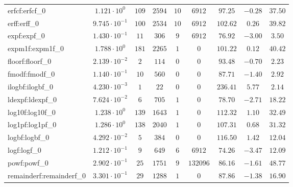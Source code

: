 \begin{tabular}{|l|c|c|c|c|c|c|c|c|}
erfcf:erfcf\_0               & $ 1.121 \cdot 10^{0}  $ & $ 109    $ & $ 2594  $ & $ 10  $ & $ 6912   $ & $ 97.25       $ & $ -0.28   $ & $ 37.50   $ \\
erff:erff\_0                 & $ 9.745 \cdot 10^{-1} $ & $ 100    $ & $ 2534  $ & $ 10  $ & $ 6912   $ & $ 102.62      $ & $ 0.26    $ & $ 39.82   $ \\
expf:expf\_0                 & $ 1.430 \cdot 10^{-1} $ & $ 11     $ & $ 306   $ & $ 9   $ & $ 6912   $ & $ 76.92       $ & $ -3.00   $ & $ 3.50    $ \\
expm1f:expm1f\_0             & $ 1.788 \cdot 10^{0}  $ & $ 181    $ & $ 2265  $ & $ 1   $ & $ 0      $ & $ 101.22      $ & $ 0.12    $ & $ 40.42   $ \\
floorf:floorf\_0             & $ 2.139 \cdot 10^{-2} $ & $ 2      $ & $ 114   $ & $ 0   $ & $ 0      $ & $ 93.48       $ & $ -0.70   $ & $ 2.23    $ \\
fmodf:fmodf\_0               & $ 1.140 \cdot 10^{-1} $ & $ 10     $ & $ 560   $ & $ 0   $ & $ 0      $ & $ 87.71       $ & $ -1.40   $ & $ 2.92    $ \\
ilogbf:ilogbf\_0             & $ 4.230 \cdot 10^{-3} $ & $ 1      $ & $ 22    $ & $ 0   $ & $ 0      $ & $ 236.41      $ & $ 5.77    $ & $ 2.14    $ \\
ldexpf:ldexpf\_0             & $ 7.624 \cdot 10^{-2} $ & $ 6      $ & $ 705   $ & $ 1   $ & $ 0      $ & $ 78.70       $ & $ -2.71   $ & $ 18.22   $ \\
log10f:log10f\_0             & $ 1.238 \cdot 10^{0}  $ & $ 139    $ & $ 1643  $ & $ 1   $ & $ 0      $ & $ 112.32      $ & $ 1.10    $ & $ 32.49   $ \\
log1pf:log1pf\_0             & $ 1.286 \cdot 10^{0}  $ & $ 138    $ & $ 2040  $ & $ 1   $ & $ 0      $ & $ 107.31      $ & $ 0.68    $ & $ 31.32   $ \\
logbf:logbf\_0               & $ 4.292 \cdot 10^{-2} $ & $ 5      $ & $ 384   $ & $ 0   $ & $ 0      $ & $ 116.50      $ & $ 1.42    $ & $ 12.04   $ \\
logf:logf\_0                 & $ 1.212 \cdot 10^{-1} $ & $ 9      $ & $ 649   $ & $ 6   $ & $ 6912   $ & $ 74.26       $ & $ -3.47   $ & $ 12.09   $ \\
powf:powf\_0                 & $ 2.902 \cdot 10^{-1} $ & $ 25     $ & $ 1751  $ & $ 9   $ & $ 132096 $ & $ 86.16       $ & $ -1.61   $ & $ 48.77   $ \\
remainderf:remainderf\_0     & $ 3.301 \cdot 10^{-1} $ & $ 29     $ & $ 1288  $ & $ 1   $ & $ 0      $ & $ 87.86       $ & $ -1.38   $ & $ 16.90   $ \\

\end{tabular}
